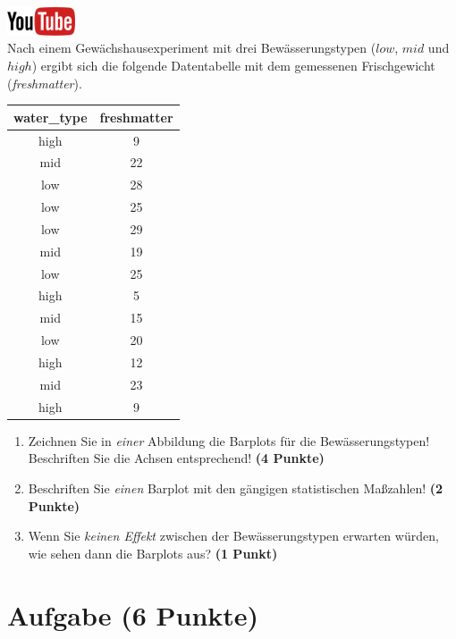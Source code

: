 \documentclass[a4paper, 10pt]{scrartcl}\usepackage[]{graphicx}\usepackage[]{xcolor}
\begin{document}
\hfill\href{https://youtu.be/vXnLttRL_VI}{\includegraphics[width =
  2cm]{img/youtube}}\\[1Ex]

Nach einem Gew{\"a}chshausexperiment mit drei Bew{\"a}sserungstypen ($low$, $mid$
und $high$) ergibt sich die folgende Datentabelle mit dem gemessenen
Frischgewicht (\textit{freshmatter}).

\begin{table}[!h]
\centering
\begin{tabular}{cc}
\toprule
water\_type & freshmatter\\
\midrule
high & 9\\
mid & 22\\
low & 28\\
low & 25\\
low & 29\\
\addlinespace
mid & 19\\
low & 25\\
high & 5\\
mid & 15\\
low & 20\\
\addlinespace
high & 12\\
mid & 23\\
high & 9\\
\bottomrule
\end{tabular}
\end{table}



\begin{enumerate}
\item Zeichnen Sie in \textit{einer} Abbildung die Barplots f{\"u}r die
  Bew{\"a}sserungstypen! Beschriften Sie die Achsen entsprechend!  \textbf{(4
    Punkte)}
\item Beschriften Sie \textit{einen} Barplot mit den g{\"a}ngigen
  statistischen Ma{\ss}zahlen! \textbf{(2 Punkte)}
\item Wenn Sie \textit{keinen Effekt} zwischen der Bew{\"a}sserungstypen
  erwarten w{\"u}rden, wie sehen dann die Barplots aus? \textbf{(1 Punkt)}
\end{enumerate} 
\clearpage

\section{Aufgabe \hfill (6 Punkte)}
\end{document}
